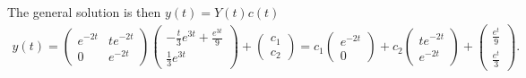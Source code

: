 \documentclass[
	12pt,
	]{article}
\theoremstyle{definition}
\theoremstyle{definition}
\theoremstyle{definition}
\theoremstyle{definition}
\theoremstyle{definition}
\theoremstyle{example}
\theoremstyle{note}
\theoremstyle{remark}
\theoremstyle{example}
\begin{document}
				The general solution is then $y(t) = Y(t)c(t)$ 
				\begin{align*}
					y(t) = \begin{pmatrix}
						e^{-2t} & te^{-2t} \\ 0 & e^{-2t}
					\end{pmatrix}
					\begin{pmatrix}
					-\frac{t}{3}e^{3t} + \frac{e^{3t}}{9} \\ \frac{1}{3}e^{3t}
					\end{pmatrix}  +
					\begin{pmatrix}
						c_{1} \\ c_{2}
					\end{pmatrix} = 
					c_{1}\begin{pmatrix}
					e^{-2t} \\ 0
					\end{pmatrix}
					+ c_{2} \begin{pmatrix}
						te^{-2t}\\ e^{-2t}
					\end{pmatrix}
					+ 
					\begin{pmatrix}
					\frac{e^{t}}{9} \\
					\frac{e^{t}}{3}
					\end{pmatrix}.
				\end{align*}
\end{document}

